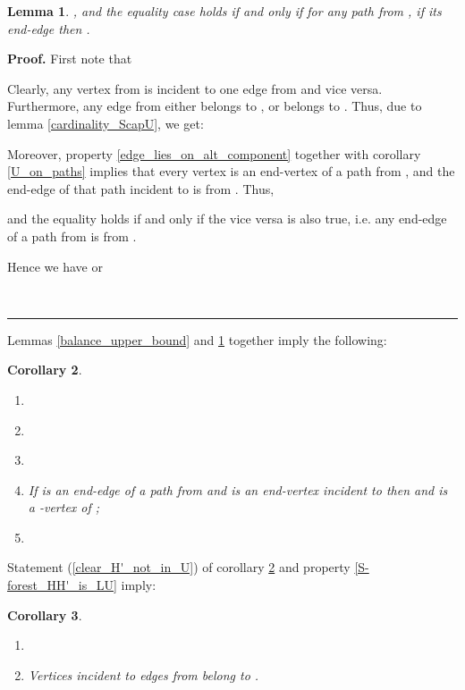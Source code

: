\documentclass[a4paper, 12pt]{article}
\newtheorem{lemma}{Lemma}[subsection]
\newtheorem{corollary}[lemma]{Corollary}
\newenvironment{proof}[1][Proof]{\noindent\textbf{#1.} }{\ \rule{0.5em}{0.5em}}
\begin{document}
\begin{lemma}\label{balance_lower_bound}
, and the equality case
holds if and only if for any path from , if its end-edge  then .
\end{lemma}
\begin{proof}
First note that


Clearly, any vertex from  is incident to one edge from  and vice versa. Furthermore, any edge from
 either belongs to , or belongs to .
Thus, due to lemma \ref{cardinality_ScapU}, we get:


Moreover, property \ref{edge_lies_on_alt_component} together with
corollary \ref{U_on_paths} implies that every vertex  is
an end-vertex of a path from , and the end-edge of that
path incident to  is from . Thus,
\setcounter{equation}{0}

and the equality holds if and only if the vice versa is also true,
i.e. any end-edge  of a path from  is
from .

Hence we have
 or

\end{proof}

\bigskip

Lemmas \ref{balance_upper_bound} and \ref{balance_lower_bound}
together imply the following:
\begin{corollary}\label{balance_corollaries}\
\renewcommand{\labelenumi}{(\arabic{enumi})}
\begin{enumerate}
\item \label{balance_equality}


\item \label{Q=R}


\item \label{lambda_remains_the_same}


\item \label{H_on_U}
If  is an end-edge of a path from 
and  is an end-vertex incident to  then  and 
is a -vertex of ;

\item \label{clear_H'_not_in_U}

\end{enumerate}
\end{corollary}

\bigskip

Statement (\ref{clear_H'_not_in_U}) of corollary
\ref{balance_corollaries} and property \ref{S-forest_HH'_is_LU}
imply:
\begin{corollary}\label{clear_H'_corollaries}\
\renewcommand{\labelenumi}{(\arabic{enumi})}
\begin{enumerate}
\item \label{clear_H' in_L}


\item \label{clear_H'_inc_vertex_in_R}
Vertices incident to edges from  belong
to .
\end{enumerate}
\end{corollary}
\end{document}
